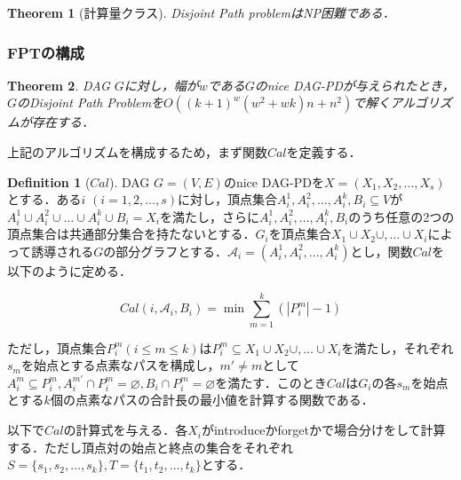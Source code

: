 \documentclass[master]{kuisthesis}		%
\theoremstyle{plain}
\newtheorem{theorem}{Theorem}
\theoremstyle{definition}
\newtheorem{definition*}{Definition}
\begin{document}
\begin{theorem}[計算量クラス]
    Disjoint Path problemはNP困難である．
\end{theorem}



\subsubsection{FPTの構成}

\begin{theorem}
    DAG $G$に対し，幅が$w$である$G$のnice DAG-PDが与えられたとき，$G$のDisjoint Path Problemを$O((k+1)^w(w^2+wk)n+n^2)$で解くアルゴリズムが存在する．
\end{theorem}

上記のアルゴリズムを構成するため，まず関数$Cal$を定義する．

\begin{definition*}[$Cal$]
    DAG $G=(V, E)$のnice DAG-PDを$X=(X_1, X_2, \dots , X_s)$とする．ある$i$ $(i=1, 2, \dots , s)$に対し，頂点集合$A^1_i, A^2_i, \dots , A^k_i, B_i \subseteq V$が$A^1_i \cup A^2_i \cup \dots \cup A^k_i \cup B_i = X_i$を満たし，さらに$A^1_i, A^2_i, \dots ,A^k_i, B_i$のうち任意の2つの頂点集合は共通部分集合を持たないとする．$G_i$を頂点集合$X_1 \cup X_2 \cup,  \dots \cup X_i$によって誘導される$G$の部分グラフとする．$\mathscr{A}_i=(A^1_i, A^2_i, \dots ,A^k_i)$とし，関数$Cal$を以下のように定める．

    \begin{equation}\label{def_cal}
        Cal(i, \mathscr{A}_i, B_i) = \min \sum_{m=1}^k (|P^m_i| - 1)
    \end{equation}


    ただし，頂点集合$P^m_i (i\leq m \leq k)$は$P^m_i \subseteq X_1 \cup X_2 \cup,  \dots \cup X_i$を満たし，それぞれ$s_m$を始点とする点素なパスを構成し，$m' \neq m$として$A^m_i \subseteq P^m_i, A^{m'}_i \cap P^m_i = \varnothing, B_i \cap P^m_i = \varnothing$を満たす．このとき$Cal$は$G_i$の各$s_m$を始点とする$k$個の点素なパスの合計長の最小値を計算する関数である．
\end{definition*}


以下で$Cal$の計算式を与える．各$X_i$がintroduceかforgetかで場合分けをして計算する．ただし頂点対の始点と終点の集合をそれぞれ$S=\{s_1, s_2, \dots, s_k\}, T=\{t_1, t_2, \dots, t_k\}$とする．

\end{document}
